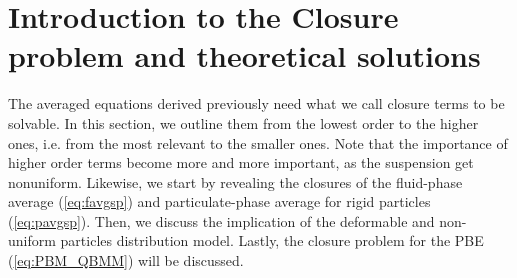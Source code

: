 \section{Introduction to the Closure problem and theoretical solutions}
\label{sec:closure}


The averaged equations derived previously need what we call closure terms to be solvable. 
In this section, we outline them from the lowest order to the higher ones, i.e. from the most relevant to the smaller ones.
Note that the importance of higher order terms become more and more important, as the suspension get nonuniform. 
Likewise, we start by revealing the closures of the fluid-phase average (\ref{eq:favgsp}) and particulate-phase average for rigid particles (\ref{eq:pavgsp}). 
Then, we discuss the implication of the deformable and non-uniform particles distribution model. 
Lastly, the closure problem for the PBE (\ref{eq:PBM_QBMM}) will be discussed. 


